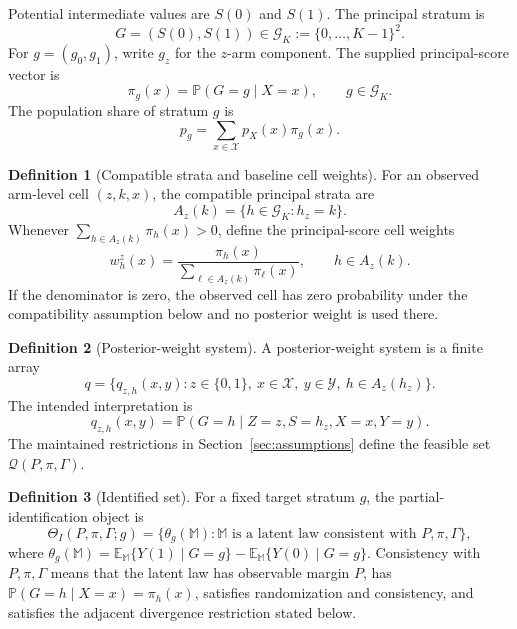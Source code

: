 \documentclass[11pt]{article}
\newcommand{\E}{\mathbb{E}}
\renewcommand{\Pr}{\mathbb{P}}
\theoremstyle{definition}
\newtheorem{definition}{Definition}
\theoremstyle{plain}
\theoremstyle{remark}
\begin{document}
Potential intermediate values are \(S(0)\) and \(S(1)\).  The principal stratum
is
\[
  G=(S(0),S(1))\in\mathcal G_K:=\{0,\ldots,K-1\}^2.
\]
For \(g=(g_0,g_1)\), write \(g_z\) for the \(z\)-arm component.  The supplied
principal-score vector is
\[
  \pi_g(x)=\Pr(G=g\mid X=x),\qquad g\in\mathcal G_K.
\]
The population share of stratum \(g\) is
\[
  p_g=\sum_{x\in\mathcal X}p_X(x)\pi_g(x).
\]

\begin{definition}[Compatible strata and baseline cell weights]\label{def:cell-weights}
For an observed arm-level cell \((z,k,x)\), the compatible principal strata are
\[
  A_z(k)=\{h\in\mathcal G_K:h_z=k\}.
\]
Whenever \(\sum_{h\in A_z(k)}\pi_h(x)>0\), define the principal-score cell
weights
\[
  w^z_h(x)=
  \frac{\pi_h(x)}{\sum_{\ell\in A_z(k)}\pi_\ell(x)},
  \qquad h\in A_z(k).
\]
If the denominator is zero, the observed cell has zero probability under the
compatibility assumption below and no posterior weight is used there.
\end{definition}

\begin{definition}[Posterior-weight system]\label{def:posterior-system}
A posterior-weight system is a finite array
\[
  q=\{q_{z,h}(x,y): z\in\{0,1\},\ x\in\mathcal X,\ y\in\mathcal Y,\ h\in A_z(h_z)\}.
\]
The intended interpretation is
\[
  q_{z,h}(x,y)
  =
  \Pr(G=h\mid Z=z,S=h_z,X=x,Y=y).
\]
The maintained restrictions in Section~\ref{sec:assumptions} define the
feasible set \(\mathcal Q(P,\pi,\Gamma)\).
\end{definition}

\begin{definition}[Identified set]\label{def:identified-set}
For a fixed target stratum \(g\), the partial-identification object is
\[
  \Theta_I(P,\pi,\Gamma;g)
  =
  \{\theta_g(\mathbb M): \mathbb M
    \text{ is a latent law consistent with }P,\pi,\Gamma\},
\]
where \(\theta_g(\mathbb M)=\E_{\mathbb M}\{Y(1)\mid G=g\}
-\E_{\mathbb M}\{Y(0)\mid G=g\}\).  Consistency with \(P,\pi,\Gamma\) means
that the latent law has observable margin \(P\), has
\(\Pr(G=h\mid X=x)=\pi_h(x)\), satisfies randomization and consistency, and
satisfies the adjacent divergence restriction stated below.
\end{definition}
\end{document}
